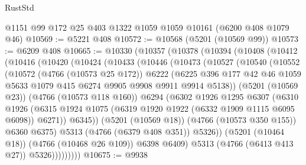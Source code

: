 \begin{lexlean}{RustStd}
\begin{coremodule}
{\begin{coremodule}
{{{{{{{{{{{{{{{{{{{{{{{{{{{{{{{{{{{    @1151
    @99
    @172
    @25
    @403
    @1322
    @1059
    @1059
    @10161
    (@6200 @408 @1079 @46)
@10569 := @5221 @408
@10572 := @10568 (@5201 (@10569 @99))
@10573 := @6209 @408
@10665 := @10330
    (@10357
      (@10378
        (@10394
          (@10408
            (@10412
              (@10416
                (@10420
                  (@10424
                    (@10433
                      (@10446
                        (@10473
                          (@10527
                            (@10540
                              (@10552
                                (@10572
                                  (@4766 (@10573 @25 @172))
                                  @6222
                                  (@6225
                                    @396
                                    @177
                                    @42
                                    @46
                                    @1059
                                    @5633
                                    @1079
                                    @415
                                    @6274
                                    @9905
                                    @9908
                                    @9911
                                    @9914
                                    @5138))
                                (@5201 (@10569 @23))
                                (@4766 (@10573 @118 @160))
                                @6294
                                (@6302
                                  @1926
                                  @1295
                                  @6307
                                  (@6310
                                    @1926
                                    (@6315
                                      @1924
                                      @1075
                                      (@6319 @1920 @1922 (@6332 @1909 @1115 @6095 @6098))
                                      @6271))
                                  @6345))
                              (@5201 (@10569 @18))
                              (@4766 (@10573 @350 @155))
                              @6360
                              @6375)
                            @5313
                            (@4766 (@6379 @408 @351))
                            @5326))
                        (@5201 (@10464 @18))
                        (@4766 (@10468 @26 @109))
                        @6398
                        @6409)
                      @5313
                      (@4766 (@6413 @413 @27))
                      @5326)))))))))
@10675 := @9938
}}}}}}}}}}}}}}}}}}}}}}}}}}}}}}}}}}}
\end{coremodule}}
\end{coremodule}
\end{lexlean}
